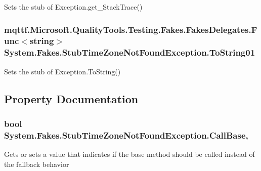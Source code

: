 Sets the stub of Exception.\-get\-\_\-\-Stack\-Trace()

\hypertarget{class_system_1_1_fakes_1_1_stub_time_zone_not_found_exception_a815c4ffd0f77ca4137db453be28c9fd9}{
\subsubsection[{To\-String01}]{\setlength{\rightskip}{0pt plus 5cm}mqttf.\-Microsoft.\-Quality\-Tools.\-Testing.\-Fakes.\-Fakes\-Delegates.\-Func$<$string$>$ System.\-Fakes.\-Stub\-Time\-Zone\-Not\-Found\-Exception.\-To\-String01}}\label{class_system_1_1_fakes_1_1_stub_time_zone_not_found_exception_a815c4ffd0f77ca4137db453be28c9fd9}


Sets the stub of Exception.\-To\-String()



\subsection{Property Documentation}
\hypertarget{class_system_1_1_fakes_1_1_stub_time_zone_not_found_exception_a6a64eb31be6ff5355e17b15a5743d6c6}{
\subsubsection[{Call\-Base}]{\setlength{\rightskip}{0pt plus 5cm}bool System.\-Fakes.\-Stub\-Time\-Zone\-Not\-Found\-Exception.\-Call\-Base\hspace{0.3cm}{\ttfamily [get]}, {\ttfamily [set]}}}\label{class_system_1_1_fakes_1_1_stub_time_zone_not_found_exception_a6a64eb31be6ff5355e17b15a5743d6c6}


Gets or sets a value that indicates if the base method should be called instead of the fallback behavior

